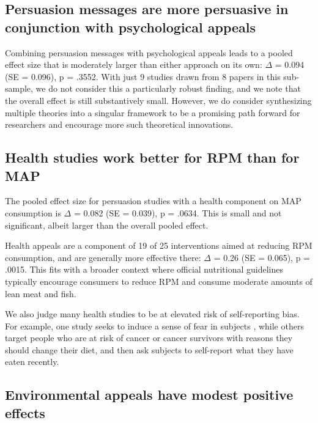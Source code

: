 \documentclass[sn-nature,referee,pdflatex]{sn-jnl}
\begin{document}
\begin{comment} maybe say something about Had our search extended to 2024, we would have likely included many more studies, many of which find small or null effects [cite]
\end{comment}

\subsection{Persuasion messages are more persuasive in conjunction with
psychological appeals}\label{sec2.6}

Combining persuasion messages with psychological appeals leads to a
pooled effect size that is moderately larger than either approach on its
own: \(\Delta\) = 0.094 (SE = 0.096), p = .3552. With just 9 studies
drawn from 8 papers in this sub-sample, we do not consider this a
particularly robust finding, and we note that the overall effect is
still substantively small. However, we do consider synthesizing multiple
theories into a singular framework to be a promising path forward for
researchers and encourage more such theoretical innovations.

\subsection{Health studies work better for RPM than for
MAP}\label{sec2.7}

The pooled effect size for persuasion studies with a health component on
MAP consumption is \(\Delta\) = 0.082 (SE = 0.039), p = .0634. This is
small and not significant, albeit larger than the overall pooled effect.

Health appeals are a component of 19 of 25 interventions aimed at
reducing RPM consumption, and are generally more effective there:
\(\Delta\) = 0.26 (SE = 0.065), p = .0015. This fits with a broader
context where official nutritional guidelines typically encourage
consumers to reduce RPM and consume moderate amounts of lean meat and
fish.

We also judge many health studies to be at elevated risk of
self-reporting bias. For example, one study seeks to induce a sense of
fear in subjects \citep{berndsen2005}, while others target people who
are at risk of cancer \citep{hatami2018} or cancer survivors
\citep{james2015, lee2018} with reasons they should change their diet,
and then ask subjects to self-report what they have eaten recently.

\subsection{Environmental appeals have modest positive
effects}\label{sec2.8}
\end{document}
